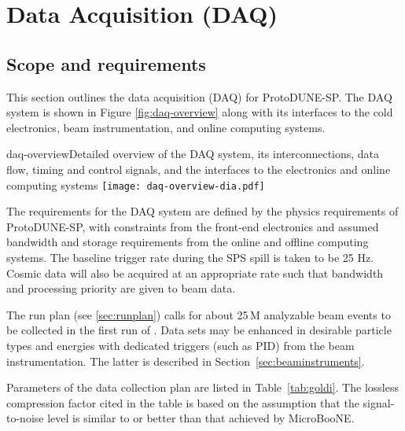 \section{Data Acquisition (DAQ)} 
\label{sec:daq}

\subsection{Scope and requirements}

This section outlines the data acquisition (DAQ) for ProtoDUNE-SP.
The DAQ system is shown in Figure \ref{fig:daq-overview} along with its
interfaces to the cold electronics, beam instrumentation, and online
computing systems.


\begin{cdrfigure}{daq-overview}{Detailed overview of the
DAQ system, its interconnections, data flow, timing and control signals,
and the interfaces to the electronics and online computing systems}
        \texttt{[image: daq-overview-dia.pdf]}
\end{cdrfigure}

The requirements for the DAQ system are defined
by the physics requirements of  ProtoDUNE-SP, with constraints from the
front-end electronics and assumed bandwidth and storage requirements
from the online and offline computing systems.  The baseline trigger
rate during the SPS spill is taken to be 25 Hz.  Cosmic data will also
be acquired at an appropriate rate such that bandwidth and processing priority are given 
to beam data.

The run plan (see \ref{sec:runplan}) calls for about 25\,M analyzable beam events
to be collected in the first run of \pdsp. Data sets may be enhanced  in desirable particle types and energies
with dedicated triggers (such as PID)  from the beam instrumentation. The latter is described in Section~\ref{sec:beaminstruments}.

Parameters of the data collection plan are listed in Table~\ref{tab:goldi}. The lossless 
compression factor cited
in the table is based on the assumption that the signal-to-noise level 
is similar to or better than that achieved by MicroBooNE. 

